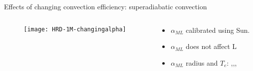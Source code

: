 \begin{frame}{Effects of changing convection efficiency: superadiabatic convection}
\begin{columns}[T]
\begin{column}{0.5\textwidth}
\begin{figure}[!ht]\texttt{[image: HRD-1M-changingalpha]}\label{fig:HRD-changingHe}
\end{figure}
\end{column}
\begin{column}{0.5\textwidth}
\begin{itemize}
    \item $\alpha_{ML}$ calibrated using Sun.
    \item $\alpha_{ML}$ does not affect L
    \item $\alpha_{ML}$ radius and $T_e$: \xaumenta{\alpha},\xdiminuisce{\nabla},,
\end{itemize}
\end{column}
\end{columns}
\end{frame}

